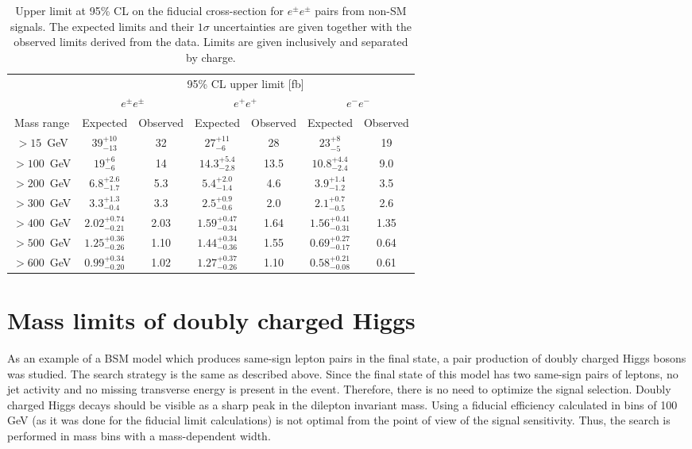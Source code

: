 \begin{table*}[!ht]
\begin{center}
\begin{tabular}{c||c|c||c|c||c|c}

 & \multicolumn{6}{c}{95\%  CL upper limit [fb]} \\
 & \multicolumn{2}{c||}{$e^{\pm}e^{\pm}$} & \multicolumn{2}{c||}{$e^{+}e^{+}$} & \multicolumn{2}{c}{$e^{-}e^{-}$} \\
Mass range & Expected & Observed & Expected & Observed & Expected & Observed \\
\hline
\rule{0pt}{3ex}
  $>15$~GeV   &  $39^{+10}_{-13}$        &  32    &    $27^{+11}_{-6}$         &  28    &    $23^{+8}_{-5}$          &  19\\
  $>100$~GeV  &  $19^{+6}_{-6}$          &  14    &    $14.3^{+5.4}_{-2.8}$    &  13.5  &    $10.8^{+4.4}_{-2.4}$    &  9.0\\
  $>200$~GeV  &  $6.8^{+2.6}_{-1.7}$     &  5.3   &    $5.4^{+2.0}_{-1.4}$     &  4.6   &    $3.9^{+1.4}_{-1.2}$     &  3.5\\
  $>300$~GeV  &  $3.3^{+1.3}_{-0.4}$     &  3.3   &    $2.5^{+0.9}_{-0.6}$     &  2.0   &    $2.1^{+0.7}_{-0.5}$     &  2.6\\
  $>400$~GeV  &  $2.02^{+0.74}_{-0.21}$  &  2.03  &    $1.59^{+0.47}_{-0.34}$  &  1.64  &    $1.56^{+0.41}_{-0.31}$  &  1.35\\
  $>500$~GeV  &  $1.25^{+0.36}_{-0.26}$  &  1.10  &    $1.44^{+0.34}_{-0.36}$  &  1.55  &    $0.69^{+0.27}_{-0.17}$  &  0.64\\
  $>600$~GeV  &  $0.99^{+0.34}_{-0.20}$  &  1.02  &    $1.27^{+0.37}_{-0.26}$  &  1.10  &    $0.58^{+0.21}_{-0.08}$  &  0.61\\

\end{tabular}
\end{center}
 \caption{Upper limit at 95\% CL on the fiducial cross-section for $e^{\pm} e^{\pm}$ pairs from non-SM signals. 
 The expected limits and their $1 \sigma$ uncertainties are given together with the observed limits derived from the data. 
 Limits are given inclusively and separated by charge.}
\label{tab:limits}
\end{table*}


\section{Mass limits of doubly charged Higgs}
As an example of a BSM model which produces same-sign lepton pairs in the final state, a pair production of doubly charged Higgs bosons was studied.
The search strategy is the same as described above.
Since the final state of this model has two same-sign pairs of leptons, no jet activity and no missing transverse energy is present in the event.
Therefore, there is no need to optimize the signal selection.
Doubly charged Higgs decays should be visible as a sharp peak in the dilepton invariant mass.
Using a fiducial efficiency calculated in bins of 100 GeV (as it was done for the fiducial limit calculations) is not optimal from the point of view of the signal sensitivity.
Thus, the search is performed in mass bins with a mass-dependent width.

